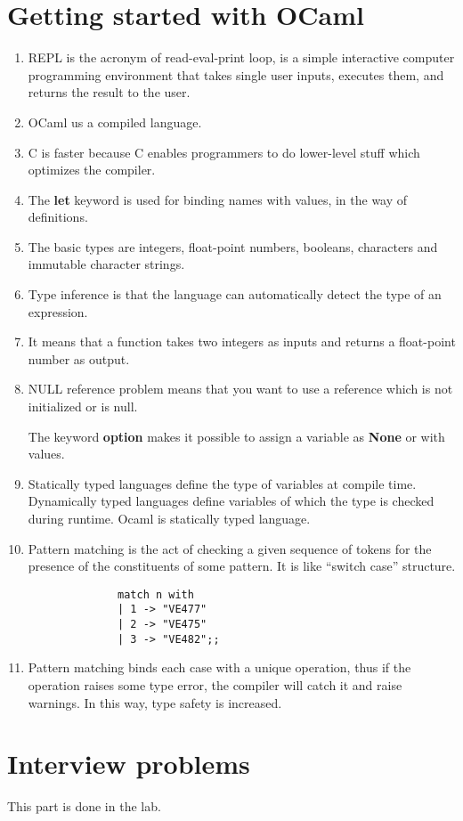\documentclass[12pt, a4paper]{article}
\begin{document}
\section{Getting started with OCaml}
\begin{enumerate}
    \item REPL is the acronym of read-eval-print loop, is a simple interactive computer programming environment that takes single user inputs, 
          executes them, and returns the result to the user.

    \item OCaml us a compiled language.
    
    \item C is faster because C enables programmers to do lower-level stuff which optimizes the compiler.
    
    \item The \textbf{let} keyword is used for binding names with values, in the way of definitions.
    
    \item The basic types are integers, float-point numbers, booleans, characters and immutable character strings.
    
    \item Type inference is that the language can automatically detect the type of an expression.
    
    \item It means that a function takes two integers as inputs and returns a float-point number as output.
    
    \item NULL reference problem means that you want to use a reference which is not initialized or is null.
    
          The keyword \textbf{option} makes it possible to assign a variable as \textbf{None} or with values.
    
    \item Statically typed languages define the type of variables at compile time. 
          Dynamically typed languages define variables of which the type is checked during runtime. Ocaml is statically typed language.

    \item Pattern matching is the act of checking a given sequence of tokens for the presence of the constituents of some pattern. 
          It is like ``switch case'' structure.

          \begin{lstlisting}
              match n with
              | 1 -> "VE477"
              | 2 -> "VE475"
              | 3 -> "VE482";;
          \end{lstlisting}
    
    \item Pattern matching binds each case with a unique operation, thus if the operation raises some type error, 
          the compiler will catch it and raise warnings. In this way, type safety is increased.

\end{enumerate}

\section{Interview problems}

This part is done in the lab.
\end{document}
